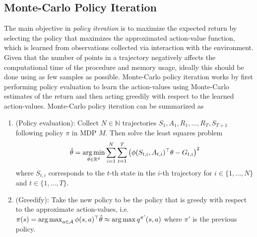 \subsection{Monte-Carlo Policy Iteration} The main objective in \textit{policy iteration} is to maximize the expected return by selecting the policy that maximizes the approximated action-value function, which is learned from observations collected via interaction with the environment. Given that the number of points in a trajectory negatively affects the computational time of the procedure and memory usage, ideally this should be done using as few samples as possible. Monte-Carlo policy iteration works by first performing policy evaluation to learn the action-values using Monte-Carlo estimates of the return and then acting greedily with respect to the learned action-values. Monte-Carlo policy iteration can be summarized as 
\begin{enumerate}
    \item (Policy evaluation): Collect $N \in \mathbb{N}$ trajectories $S_{1},A_1,R_1,\dotsc,R_T,S_{T+1}$ following policy $\pi$ in MDP $M$. Then solve the least squares problem 
    \begin{align*}
        \hat\theta = \mathop{\rm arg\,min}_{\theta \in \mathbb{R}^d} \sum_{i=1}^N\sum_{t=1}^T \left(\phi(S_{t,i},A_{t,i})^\top \theta - G_{t,i}\right)^2
    \end{align*}
    where $S_{t,i}$ corresponds to the $t$-th state in the $i$-th trajectory for $i \in \{1,\dotsc,N\}$ and $t \in \{1,\dotsc,T\}$.
    \item (Greedify): Take the new policy to be the policy that is greedy with respect to the approximate action-values, i.e. $\pi(s) = \mathop{\rm arg\,max}_{a \in \mathcal{A}} \phi(s,a)^\top \hat\theta \approx \mathop{\rm arg\,max} q^{\pi'}(s, a)$ where $\pi'$ is the previous policy.
\end{enumerate}
